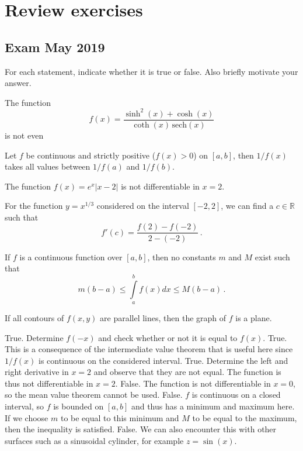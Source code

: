 \chapter{Review exercises}
\graphicspath{{figures/Synthese-oefeningen/}}


\ifanalysis

\section{Exam May 2019}

\begin{Exercise} %
For each statement, indicate whether it is true or false. Also briefly motivate your answer.

\Question The function 
$$
f(x)=\dfrac{\sinh^2(x)+\cosh(x)}{\coth(x)\,\text{sech}(x)}
$$
is not even 

\Question Let $f$ be continuous and strictly positive ($f(x)>0$) on $[a,b]$, then $1/f(x)$  takes all values between $1/f(a)$ and $1/f(b)$.

\Question The function $f(x)=e^x|x-2|$ is not differentiable in $x=2$.

\Question For the function $y=x^{1/3}$ considered on the interval $[-2,2]$, we can find a $c\in\mathbb{R}$ such that
$$
f'(c)=\dfrac{f(2)-f(-2)}{2-(-2)}\,.
$$

\Question If $f$ is a continuous function over $[a,b]$, then no constants $m$ and $M$ exist such that
$$
m(b-a)\leq\int\limits_a^b f(x)dx\leq M(b-a)\,.
$$

\Question  If all contours of $f(x,y)$ are parallel lines, then the graph of $f$ is a plane.
\EndCurrentQuestion
\end{Exercise}


\begin{Answer}\phantom{}
  \Question True. Determine $f(-x)$ and check whether or not it is equal to $f(x)$.
  \Question True. This is a consequence of the intermediate value theorem that is useful here since $1/f(x)$ is continuous on the considered interval.
  \Question True. Determine the left and right derivative in $x=2$ and observe that they are not equal. The function is thus not differentiable in $x=2$.
  \Question False. The function is not differentiable in $x=0$, so the mean value theorem cannot be used.
  \Question False. $f$ is continuous on a closed interval, so $f$ is bounded on $[a,b]$ and thus has a minimum and maximum here. If we choose $m$ to be equal to this minimum and $M$ to be equal to the maximum, then the inequality is satisfied.
  \Question False. We can also encounter this with other surfaces such as a sinusoidal cylinder, for example $z=\sin(x)$.
\end{Answer}

